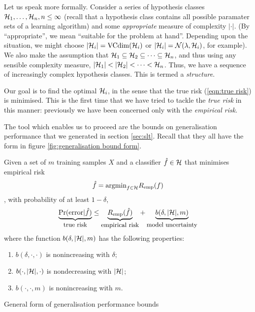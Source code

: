 Let us speak more formally.  Consider a series of hypothesis
classes $\mathcal{H}_1, \ldots, \mathcal{H}_n, n \leq \infty$ (recall that a
hypothesis class contains all possible paramater sets of a learning
algorithm) and some \emph{appropriate} measure of complexity
$|\cdot|$.  (By ``appropriate'', we mean ``suitable for the problem at
hand''. Depending upon the situation, we might choose $|\mathcal{H}_i| =
\mathrm{VCdim}(\mathcal{H}_i)$ or $|\mathcal{H}_i| = \mathcal{N}({\lambda}, {\mathcal{H}_i})$, for
example).  We also make the assumption that $\mathcal{H}_1 \subseteq \mathcal{H}_2
\subseteq \cdots \subseteq \mathcal{H}_n$, and thus using any sensible
complexity measure, $|\mathcal{H}_1| < |\mathcal{H}_2| < \cdots < \mathcal{H}_n$.  Thus,
we have a sequence of increasingly complex hypothesis classes.  This
is termed a \emph{structure}.

Our goal is to find the optimal $\mathcal{H}_i$, in the sense that the
true risk (\ref{eqn:true risk}) is minimised.  This is the
first time that we have tried to tackle the \emph{true risk} in this manner:
previously we have been concerned only with the \emph{empirical risk}.

The tool which enables us to proceed are the bounds on generalisation
performance that we generated in section \ref{sec:slt}.  Recall that
they all have the form in figure \ref{fig:generalisation bound form}.

\begin{linefigure}
Given a set of $m$ training samples $X$ and a classifier $\hat{f} \in \mathcal{H}$
that minimises empirical risk
\begin{equation*}
\hat{f} = \mathrm{argmin}_{f \in
\mathcal{H}} R_{\mathrm{emp}}(f)
\end{equation*}
, with probability of at least $1 - \delta$,
%
\begin{equation}
\underbrace{\Pr(\mathrm{error}|\hat{f})}_{\mbox{\small{true risk}}} \leq 
\underbrace{R_{\mathrm{emp}}(\hat{f})}_{\mbox{\small{empirical risk}}} +
\underbrace{b(\delta, |\mathcal{H}|, m)}_{\mbox{\small{model uncertainty}}}
\label{eqn:general bound}
\end{equation}
%
where the function $b(\delta, |\mathcal{H}|, m)$ has the following
properties:
\begin{enumerate}
\item	$b(\delta, \cdot, \cdot)$ is nonincreasing with $\delta$;
\item	$b(\cdot, |\mathcal{H}|, \cdot)$ is nondecreasing with $|\mathcal{H}|$;
\item	$b(\cdot, \cdot, m)$ is nonincreasing with $m$.
\end{enumerate}
\caption{General form of generalisation performance bounds}
\label{fig:generalisation bound form}
\end{linefigure}

